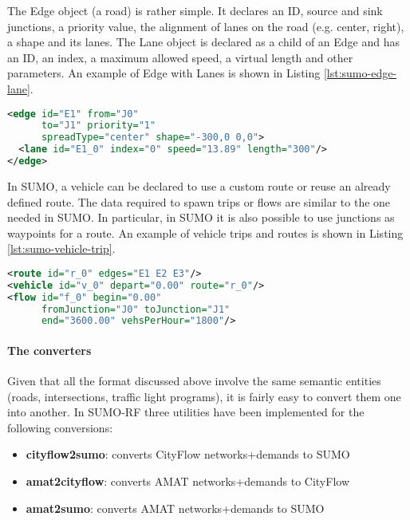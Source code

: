 The Edge object (a road) is rather simple. It declares an ID, source and sink junctions, a priority value, the alignment of lanes on the road (e.g. center, right), a shape and its lanes.
The Lane object is declared as a child of an Edge and has an ID, an index, a maximum allowed speed, a virtual length and other parameters.
An example of Edge with Lanes is shown in Listing \ref{lst:sumo-edge-lane}.

\noindent
\begin{minipage}{\linewidth}
\begin{lstlisting}[language=XML, caption=Example of Edge declaration in SUMO format, label={lst:sumo-edge-lane}]
<edge id="E1" from="J0"
      to="J1" priority="1"
      spreadType="center" shape="-300,0 0,0">
  <lane id="E1_0" index="0" speed="13.89" length="300"/>
</edge>
\end{lstlisting}
\end{minipage}

In SUMO, a vehicle can be declared to use a custom route or reuse an already defined route.
The data required to spawn trips or flows are similar to the one needed in SUMO.
In particular, in SUMO it is also possible to use junctions as waypoints for a route.
An example of vehicle trips and routes is shown in Listing \ref{lst:sumo-vehicle-trip}.

\noindent
\begin{minipage}{\linewidth}
\begin{lstlisting}[language=XML, caption=Example of vehicle trip and route declaration in SUMO format, label={lst:sumo-vehicle-trip}]
<route id="r_0" edges="E1 E2 E3"/>
<vehicle id="v_0" depart="0.00" route="r_0"/>
<flow id="f_0" begin="0.00"
      fromJunction="J0" toJunction="J1"
      end="3600.00" vehsPerHour="1800"/>
\end{lstlisting}
\end{minipage}

\paragraph{The converters}

Given that all the format discussed above involve the same semantic entities (roads, intersections, traffic light programs), it is fairly easy to convert them one into another.
In SUMO-RF three utilities have been implemented for the following conversions:

\begin{itemize}
  \item \textbf{cityflow2sumo}: converts CityFlow networks+demands to SUMO
  \item \textbf{amat2cityflow}: converts AMAT networks+demands to CityFlow
  \item \textbf{amat2sumo}: converts AMAT networks+demands to SUMO
\end{itemize}

